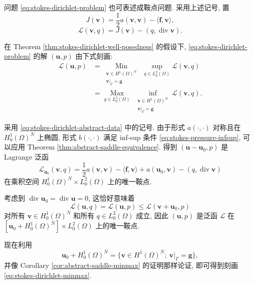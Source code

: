 问题 \eqref{eq:stokes-dirichlet-problem} 也可表述成鞍点问题.
采用上述记号, 置
\begin{equation}\label{eq:stokes-dirichlet-energy}
J(\mathbf{v})
=\frac12a(\mathbf{v},\mathbf{v})
-\langle\mathbf{f},\mathbf{v}\rangle,
\end{equation}
\begin{equation}\label{eq:stokes-dirichlet-lagrangian}
\mathcal{L}(\mathbf{v},q)
=J(\mathbf{v})-(q,\operatorname{div}\mathbf{v}).
\end{equation}

\setcounter{statement}{1}
\begin{Theorem}\label{thm:stokes-dirichlet-saddle-characterization}
在 Theorem \ref{thm:stokes-dirichlet-well-posedness} 的假设下,
\eqref{eq:stokes-dirichlet-problem} 的解 $(\mathbf{u},p)$ 由下式刻画:
\begin{equation}\label{eq:stokes-dirichlet-minmax}
\begin{aligned}
\mathcal{L}(\mathbf{u},p)
&=
\operatorname*{Min}_{\substack{
\mathbf{v}\in H^1(\Omega)^N\\
\mathbf{v}|_\Gamma=\mathbf{g}}}
\ \sup_{q\in L_0^2(\Omega)}
\mathcal{L}(\mathbf{v},q)\\
&=
\operatorname*{Max}_{q\in L_0^2(\Omega)}
\ \inf_{\substack{
\mathbf{v}\in H^1(\Omega)^N\\
\mathbf{v}|_\Gamma=\mathbf{g}}}
\mathcal{L}(\mathbf{v},q).
\end{aligned}
\end{equation}
\end{Theorem}
\begin{Proof}
采用 \eqref{eq:stokes-dirichlet-abstract-data} 中的记号.
由于形式 $a(\cdot,\cdot)$ 对称且在 $H_0^1(\Omega)^N$ 上椭圆,
形式 $b(\cdot,\cdot)$ 满足 inf-sup 条件
\eqref{eq:stokes-pressure-infsup}, 可以应用 Theorem
\ref{thm:abstract-saddle-equivalence}. 得到
$(\mathbf{u}-\mathbf{u}_0,p)$ 是 Lagrange 泛函
\[
\mathcal{L}_{\mathbf{u}_0}(\mathbf{v},q)
=\frac12a(\mathbf{v},\mathbf{v})
-\langle\mathbf{f},\mathbf{v}\rangle
+a(\mathbf{u}_0,\mathbf{v})
-(q,\operatorname{div}\mathbf{v})
\]
在乘积空间 $H_0^1(\Omega)^N\times L_0^2(\Omega)$ 上的唯一鞍点.

考虑到
$\operatorname{div}\mathbf{u}_0
=\operatorname{div}\mathbf{u}=0$, 这恰好意味着
\[
\mathcal{L}(\mathbf{u},q)
=\mathcal{L}(\mathbf{u},p)
\le
\mathcal{L}(\mathbf{v}+\mathbf{u}_0,p)
\]
对所有 $\mathbf{v}\in H_0^1(\Omega)^N$ 和所有
$q\in L_0^2(\Omega)$ 成立, 因此
$(\mathbf{u},p)$ 是泛函 $\mathcal{L}$ 在
$[\mathbf{u}_0+H_0^1(\Omega)^N]\times L_0^2(\Omega)$ 上的唯一鞍点.

现在利用
\[
\mathbf{u}_0+H_0^1(\Omega)^N
=\{\mathbf{v}\in H^1(\Omega)^N;
\ \mathbf{v}|_\Gamma=\mathbf{g}\},
\]
并像 Corollary \ref{cor:abstract-saddle-minmax} 的证明那样论证,
即可得到刻画 \eqref{eq:stokes-dirichlet-minmax}.
\end{Proof}

